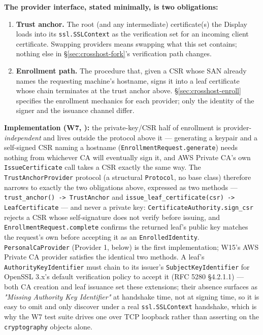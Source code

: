 \documentclass[a4paper,10pt]{article}
\newcommand{\modpath}[1]{\path{src/punt_lux/#1}}
\newcommand{\field}[1]{\texttt{#1}}
\begin{document}
\textbf{The provider interface, stated minimally, is two obligations:}

\begin{enumerate}
  \item \textbf{Trust anchor.}  The root (and any intermediate)
    certificate(s) the Display loads into its \field{ssl.SSLContext} as
    the verification set for an incoming client certificate.  Swapping
    providers means swapping what this set contains; nothing else in
    \S\ref{sec:crosshost-fork}'s verification path changes.
  \item \textbf{Enrollment path.}  The procedure that, given a CSR whose
    SAN already names the requesting machine's hostname, signs it into a
    leaf certificate whose chain terminates at the trust anchor above.
    \S\ref{sec:crosshost-enroll} specifies the enrollment mechanics for
    each provider; only the identity of the signer and the issuance
    channel differ.
\end{enumerate}

\textbf{Implementation (W7, \modpath{punt\_lux.trust}):} the private-key/CSR
half of enrollment is provider-\emph{independent} and lives outside the
protocol above it --- generating a keypair and a self-signed CSR naming a
hostname (\field{EnrollmentRequest.generate}) needs nothing from whichever
CA will eventually sign it, and AWS Private CA's own \field{IssueCertificate}
call takes a CSR exactly the same way.  The
\field{TrustAnchorProvider} protocol (a structural \field{Protocol}, no base
class) therefore narrows to exactly the two obligations above, expressed as
two methods --- \field{trust\_anchor() -> TrustAnchor} and
\field{issue\_leaf\_certificate(csr) -> LeafCertificate} --- and never a
private key: \field{CertificateAuthority.sign\_csr} rejects a CSR whose
self-signature does not verify before issuing, and
\field{EnrollmentRequest.complete} confirms the returned leaf's public key
matches the request's own before accepting it as an
\field{EnrolledIdentity}.  \field{PersonalCaProvider} (Provider 1, below)
is the first implementation; W15's AWS Private CA provider satisfies the
identical two methods.  A leaf's \field{AuthorityKeyIdentifier} must chain
to its issuer's \field{SubjectKeyIdentifier} for OpenSSL 3.x's default
verification policy to accept it (RFC 5280 \S4.2.1.1) --- both CA creation
and leaf issuance set these extensions; their absence surfaces as
\emph{"Missing Authority Key Identifier"} at handshake time, not at
signing time, so it is easy to omit and only discover under a real
\field{ssl.SSLContext} handshake, which is why the W7 test suite drives one
over TCP loopback rather than asserting on the \field{cryptography}
objects alone.
\end{document}
